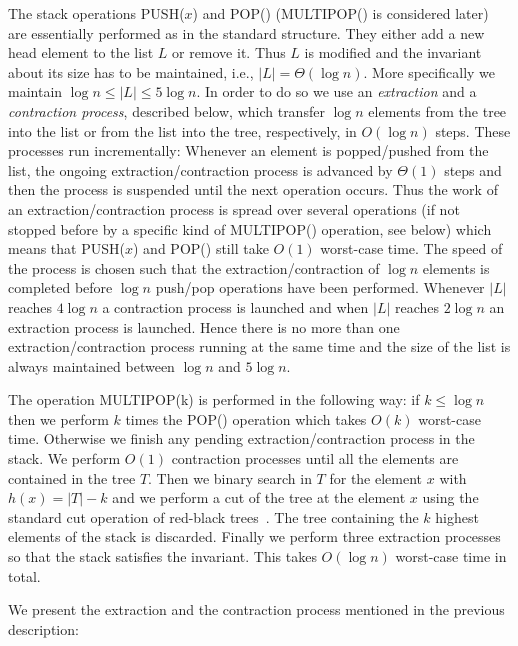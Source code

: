 \documentclass[letterpaper,11pt]{article}
\begin{document}
The stack operations {P{\scriptsize USH}($x$)} and {P{\scriptsize OP}()} ({M{\scriptsize ULTIPOP}()} is considered later) are essentially performed as in the standard structure. They either add a new head element to the list $L$ or remove it. Thus $L$ is modified and the invariant about its size has to be maintained, i.e., $|L|=\Theta( \log n)$. More specifically we maintain $\log n \leq |L| \leq 5\log n$. In order to do so we use an \emph{extraction} and a \emph{contraction  process}, described below, which transfer $\log n$ elements from the tree into the list or from the list into the tree, respectively, in $O(\log n)$ steps. These processes run incrementally: Whenever an element is popped/pushed from the list, the ongoing extraction/contraction process is advanced by $\Theta(1)$ steps and then the process is suspended until the next operation occurs. Thus the work of an extraction/contraction process is spread over several operations (if not stopped before by a specific kind of {M{\scriptsize ULTIPOP}()} operation, see below) which means that {P{\scriptsize USH}($x$)} and {P{\scriptsize OP}()} still take $O(1)$ worst-case time. The speed of the process is chosen such that the extraction/contraction of $\log n$ elements is completed before $\log n$ push/pop operations have been performed. Whenever $|L|$ reaches $4\log n$ a contraction process is launched and when $|L|$ reaches $2\log n$ an extraction process is launched. Hence there is no more than one extraction/contraction process running at the same time and the size of the list is always maintained between $\log n$ and $5\log n$. 

The operation {M{\scriptsize ULTIPOP}(k)} is performed in the following way: if $k\leq \log n$ then we perform $k$ times the {P{\scriptsize OP}()} operation which takes $O(k)$ worst-case time. Otherwise we finish any pending extraction/contraction process in the stack. We perform $O(1)$ contraction processes until all the elements are contained in the tree $T$. Then we binary search in $T$ for the element $x$ with $h(x)=|T|-k$ and we perform a cut of the tree at the element $x$ using the standard cut operation of red-black trees~\cite{redblack}. The tree containing the $k$ highest elements of the stack is discarded. Finally we perform three extraction processes so that the stack satisfies the invariant. This takes $O(\log n)$ worst-case time in total.

We present the extraction and the contraction process mentioned in the previous description: \\
\end{document}
